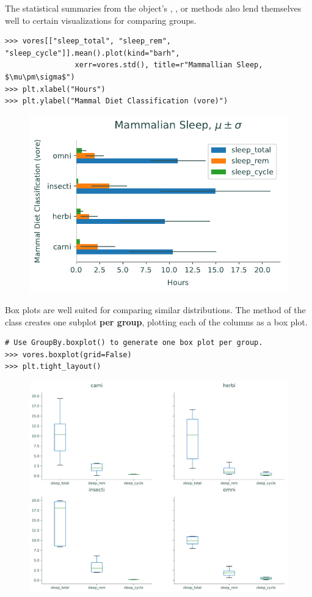 The statistical summaries from the  object's , , or  methods also lend themselves well to certain visualizations for comparing groups.

\begin{lstlisting}
>>> vores[["sleep_total", "sleep_rem", "sleep_cycle"]].mean().plot(kind="barh",
                xerr=vores.std(), title=r"Mammallian Sleep, $\mu\pm\sigma$")
>>> plt.xlabel("Hours")
>>> plt.ylabel("Mammal Diet Classification (vore)")
\end{lstlisting}

\begin{figure}[H]
    \centering
    \includegraphics[width=.7\textwidth]{figures/mammal_bar.pdf}
\end{figure}

Box plots are well suited for comparing similar distributions.
The  method of the  class creates one subplot \textbf{per group}, plotting each of the columns as a box plot.

\begin{lstlisting}
# Use GroupBy.boxplot() to generate one box plot per group.
>>> vores.boxplot(grid=False)
>>> plt.tight_layout()
\end{lstlisting}

\begin{figure}[H]
    \centering
    \includegraphics[width=.7\textwidth]{figures/mammal_box_groups.pdf}
\end{figure}

